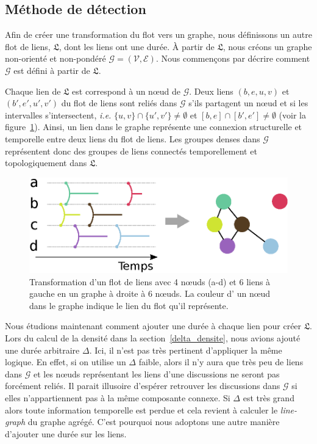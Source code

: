 \subsection{Méthode de détection}
\label{sec:fail_mailing}
Afin de créer une transformation du flot vers un graphe, nous définissons un autre flot de liens, $\mathfrak{L}$, dont les liens ont une durée.
\`A partir de $\mathfrak{L}$, nous créons un graphe non-orienté et non-pondéré $\mathcal{G} = (\mathcal{V},\mathcal{E})$. Nous commençons par décrire comment $\mathcal{G}$ est défini à partir de $\mathfrak{L}$.

Chaque lien de $\mathfrak{L}$ est correspond à un n\oe{}ud de $\mathcal{G}$.
Deux liens $(b,e,u,v)$ et $(b',e',u',v')$ du flot de liens sont reliés dans $\mathcal{G}$ s'ils partagent un n\oe{}ud et si les intervalles s'intersectent, \emph{i.e.} $\{u,v\} \cap \{u',v'\} \neq \emptyset$ et $[b,e]\cap[b',e'] \neq \emptyset$ (voir la figure~\ref{fig:Transformation}).
Ainsi, un lien dans le graphe représente une connexion structurelle et temporelle entre deux liens du flot de liens.
Les groupes denses dans $\mathcal{G}$ représentent donc des groupes de liens connectés temporellement et topologiquement dans $\mathfrak{L}$.

\begin{figure}
\centering
\includegraphics[width=0.55\linewidth]{img/mailing/Transformation.eps}
\caption{Transformation d'un flot de liens avec 4 n\oe{}uds (a-d) et 6 liens à gauche en un graphe à droite à 6 n\oe{}uds. La couleur d' un n\oe{}ud dans le graphe indique le lien du flot qu'il représente.}
\label{fig:Transformation}
\end{figure}%

Nous étudions maintenant comment ajouter une durée à chaque lien pour créer $\mathfrak{L}$.
Lors du calcul de la densité dans la section~\ref{delta_densite}, nous avions ajouté une durée arbitraire $\Delta$.
Ici, il n'est pas très pertinent d'appliquer la même logique.
En effet, si on utilise un $\Delta$ faible, alors il n'y aura que très peu de liens dans $\mathcal{G}$ et les n\oe{}uds représentant les liens d'une discussions ne seront pas forcément reliés.
Il parait illusoire d'espérer retrouver les discussions dans $\mathcal{G}$ si elles n'appartiennent pas à la même composante connexe.
Si $\Delta$ est très grand alors toute information temporelle est perdue et cela revient à calculer le \emph{line-graph} du graphe agrégé.
C'est pourquoi nous adoptons une autre manière d'ajouter une durée sur les liens.


